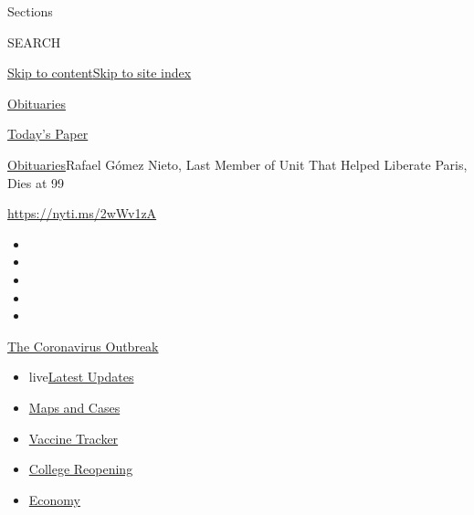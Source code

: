 Sections

SEARCH

\protect\hyperlink{site-content}{Skip to
content}\protect\hyperlink{site-index}{Skip to site index}

\href{https://www.nytimes.com/section/obituaries}{Obituaries}

\href{https://myaccount.nytimes.com/auth/login?response_type=cookie\&client_id=vi}{}

\href{https://www.nytimes.com/section/todayspaper}{Today's Paper}

\href{/section/obituaries}{Obituaries}\textbar{}Rafael Gómez Nieto, Last
Member of Unit That Helped Liberate Paris, Dies at 99

\url{https://nyti.ms/2wWv1zA}

\begin{itemize}
\item
\item
\item
\item
\item
\end{itemize}

\href{https://www.nytimes.com/news-event/coronavirus?action=click\&pgtype=Article\&state=default\&region=TOP_BANNER\&context=storylines_menu}{The
Coronavirus Outbreak}

\begin{itemize}
\tightlist
\item
  live\href{https://www.nytimes.com/2020/08/03/world/coronavirus-covid-19.html?action=click\&pgtype=Article\&state=default\&region=TOP_BANNER\&context=storylines_menu}{Latest
  Updates}
\item
  \href{https://www.nytimes.com/interactive/2020/us/coronavirus-us-cases.html?action=click\&pgtype=Article\&state=default\&region=TOP_BANNER\&context=storylines_menu}{Maps
  and Cases}
\item
  \href{https://www.nytimes.com/interactive/2020/science/coronavirus-vaccine-tracker.html?action=click\&pgtype=Article\&state=default\&region=TOP_BANNER\&context=storylines_menu}{Vaccine
  Tracker}
\item
  \href{https://www.nytimes.com/2020/08/02/us/covid-college-reopening.html?action=click\&pgtype=Article\&state=default\&region=TOP_BANNER\&context=storylines_menu}{College
  Reopening}
\item
  \href{https://www.nytimes.com/live/2020/08/03/business/stock-market-today-coronavirus?action=click\&pgtype=Article\&state=default\&region=TOP_BANNER\&context=storylines_menu}{Economy}
\end{itemize}


